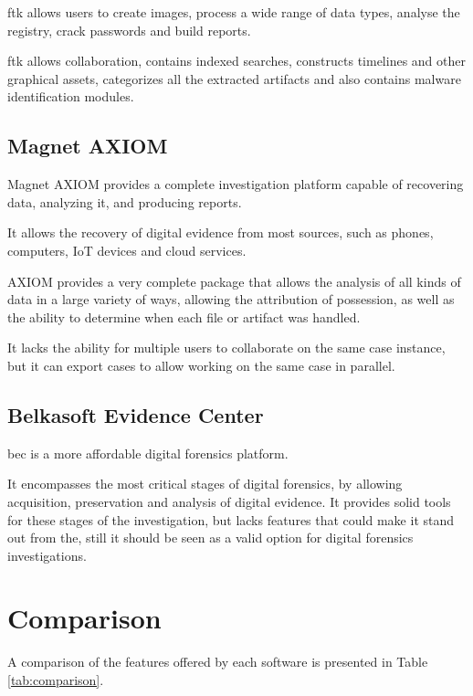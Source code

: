 \acrshort{ftk} allows users to create images, process a wide range of data types, analyse the registry, crack passwords and build reports. 

\acrshort{ftk} allows collaboration, contains indexed searches, constructs timelines and other graphical assets, categorizes all the extracted artifacts and also contains malware identification modules.

\subsection{Magnet AXIOM}

Magnet AXIOM \cite{axiom} provides a complete investigation platform capable of recovering data, analyzing it, and producing reports.

It allows the recovery of digital evidence from most sources, such as phones, computers, IoT devices and cloud services.

AXIOM provides a very complete package that allows the analysis of all kinds of data in a large variety of ways, allowing the attribution of possession, 
as well as the ability to determine when each file or artifact was handled.

It lacks the ability for multiple users to collaborate on the same case instance, but it can export cases to allow working on the same case in parallel.

\subsection{Belkasoft Evidence Center}

\acrfull{bec} \cite{bec} is a more affordable digital forensics platform.

It encompasses the most critical stages of digital forensics, by allowing acquisition, preservation and analysis of digital evidence.
It provides solid tools for these stages of the investigation, but lacks features that could make it stand out from the, 
still it should be seen as a valid option for digital forensics investigations.



\section{Comparison}

A comparison of the features offered by each software is presented in Table \ref{tab:comparison}.

